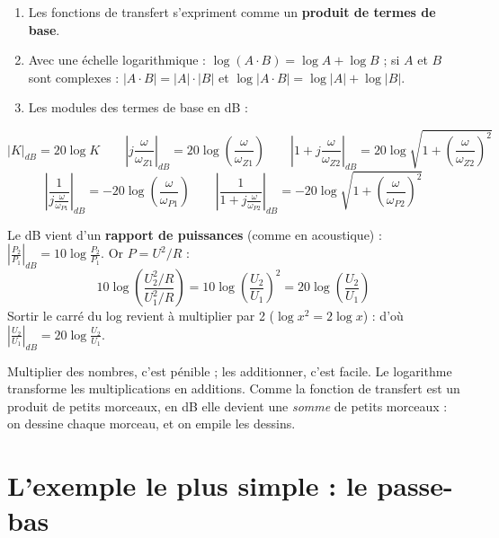 \begin{thmbox}[title=Log d'un produit = somme des log]
\begin{enumerate}
  \item Les fonctions de transfert s'expriment comme un \textbf{produit de termes de base}.
  \item Avec une échelle logarithmique : $\log(A\cdot B) = \log A + \log B$ ; si $A$ et $B$
        sont complexes : $|A\cdot B| = |A|\cdot|B|$ et
        $\log|A\cdot B| = \log|A| + \log|B|$.
  \item Les modules des termes de base en dB :
\end{enumerate}
\[ |K|_{dB} = 20\log K \qquad
   \left|j\frac{\omega}{\omega_{Z1}}\right|_{dB} = 20\log\left(\frac{\omega}{\omega_{Z1}}\right) \qquad
   \left|1 + j\frac{\omega}{\omega_{Z2}}\right|_{dB} = 20\log\sqrt{1 + \left(\frac{\omega}{\omega_{Z2}}\right)^2} \]
\[ \left|\frac1{j\frac\omega{\omega_{P1}}}\right|_{dB} = -20\log\left(\frac{\omega}{\omega_{P1}}\right) \qquad
   \left|\frac1{1 + j\frac\omega{\omega_{P2}}}\right|_{dB} = -20\log\sqrt{1 + \left(\frac{\omega}{\omega_{P2}}\right)^2} \]
\end{thmbox}

\begin{rembox}[title={Pourquoi 20 et pas 10 ? (log en base 10)}]
Le dB vient d'un \textbf{rapport de puissances} (comme en acoustique) :
$\left|\frac{P_2}{P_1}\right|_{dB} = 10\log\frac{P_2}{P_1}$. Or $P = U^2/R$ :
\[ 10\log\left(\frac{U_2^2/R}{U_1^2/R}\right) = 10\log\left(\frac{U_2}{U_1}\right)^2
   = 20\log\left(\frac{U_2}{U_1}\right) \]
Sortir le carré du log revient à multiplier par 2 ($\log x^2 = 2\log x$) : d'où
$\left|\frac{U_2}{U_1}\right|_{dB} = 20\log\frac{U_2}{U_1}$.
\end{rembox}

\begin{goatbox}
Multiplier des nombres, c'est pénible ; les additionner, c'est facile. Le logarithme
transforme les multiplications en additions. Comme la fonction de transfert est un produit
de petits morceaux, en dB elle devient une \emph{somme} de petits morceaux : on dessine
chaque morceau, et on empile les dessins.
\end{goatbox}

\section{L'exemple le plus simple : le passe-bas}


